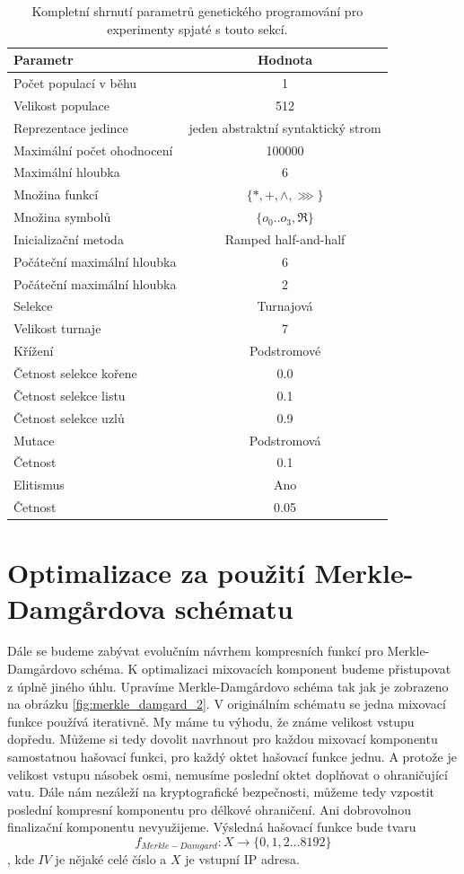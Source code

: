 \begin{table}[!ht]
	\centering
	\caption{Kompletní shrnutí parametrů genetického programování pro experimenty spjaté s touto sekcí.}
	\begin{tabular}{lc} \\ \hline
		Parametr & Hodnota \\ \hline
		Počet populací v běhu & 1 \\
		Velikost populace & 512 \\
		Reprezentace jedince & jeden abstraktní syntaktický strom \\ \hline
		Maximální počet ohodnocení & 100000 \\
		Maximální hloubka & 6 \\
		Množina funkcí & $\{*, +, \wedge, \ggg\}$ \\
		Množina symbolů & $\{o_{0} .. o_{3}, \Re \}$ \\
		\hline 
		Inicializační metoda & Ramped half-and-half \\
		Počáteční maximální hloubka & 6 \\
		Počáteční maximální hloubka & 2 \\
		\hline
		Selekce & Turnajová \\
		Velikost turnaje & 7 \\
		\hline
		Křížení & Podstromové \\
		Četnost selekce kořene & 0.0 \\
		Četnost selekce listu & 0.1 \\ 
		Četnost selekce uzlů & 0.9 \\
		\hline 
		Mutace & Podstromová \\
		Četnost & 0.1 \\
		\hline
		Elitismus & Ano \\
		Četnost & 0.05 \\
		\hline
	\end{tabular}
	\label{tab:IPHash_params}
\end{table}

\section{Optimalizace za použití Merkle-Damg\r{a}rdova schématu}

Dále se budeme zabývat evolučním návrhem kompresních funkcí pro Merkle-Damg\r{a}rdovo schéma.
K optimalizaci mixovacích komponent budeme přistupovat z úplně jiného úhlu. Upravíme  Merkle-Damg\r{a}rdovo
schéma tak jak je zobrazeno na obrázku \ref{fig:merkle_damgard_2}. V originálním schématu se
jedna mixovací funkce používá iterativně. My máme tu výhodu, že známe velikost vstupu dopředu. Můžeme
si tedy dovolit navrhnout pro každou mixovací komponentu samostatnou hašovací funkci, pro každý oktet
hašovací funkce jednu. A protože je velikost vstupu násobek osmi, nemusíme poslední oktet doplňovat o ohraničující vatu. Dále
nám nezáleží na kryptografické bezpečnosti, můžeme tedy vzpostit poslední kompresní komponentu
pro délkové ohraničení. Ani dobrovolnou finalizační komponentu nevyužijeme. Výsledná hašovací funkce
bude tvaru
$$f_{Merkle-Damgard} : X \to \{0,1,2 \ldots 8192\}$$,
kde $IV$ je nějaké celé číslo a $X$ je vstupní IP adresa.


